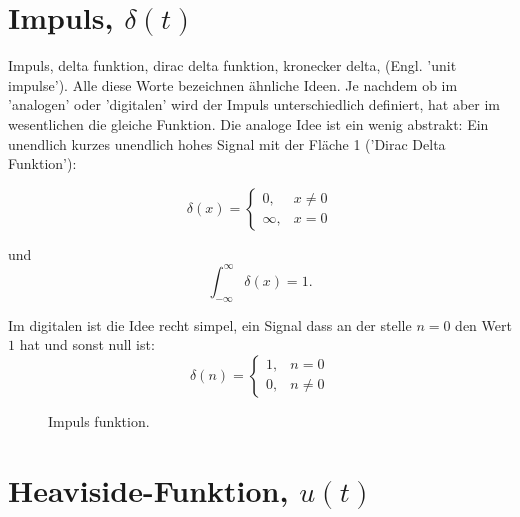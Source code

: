 \section{Impuls, $\delta(t)$}
Impuls, delta funktion, dirac delta funktion, kronecker delta, (Engl. 'unit impulse'). Alle diese Worte bezeichnen ähnliche Ideen. Je nachdem ob im 'analogen' oder 'digitalen' wird der Impuls unterschiedlich definiert, hat aber im wesentlichen die gleiche Funktion. Die analoge Idee ist ein wenig abstrakt: Ein unendlich kurzes unendlich hohes Signal mit der Fläche 1 ('Dirac Delta Funktion'):

\begin{equation}
 \delta (x)={\begin{cases}0,&x\neq 0\\{\infty },&x=0\end{cases}}
\end{equation}

und 
\begin{equation}
\int _{-\infty }^{\infty }\delta (x)=1.
\end{equation}


Im digitalen ist die Idee recht simpel, ein Signal dass an der stelle $n=0$ den Wert $1$ hat und sonst null ist:
\begin{equation}
	\delta(n) =
	\begin{cases} 
		1, & n = 0 \\ 
		0, &  n \neq 0 
\end{cases}
\end{equation}

% 	


\begin{figure}[H]
    \centering
    \subfigure[Impuls]{
        
        \label{fig:delta}
    }
    \caption{Impuls funktion.}
    \label{fig:deltaVersions}
\end{figure}



\section{Heaviside-Funktion, $u(t)$}

